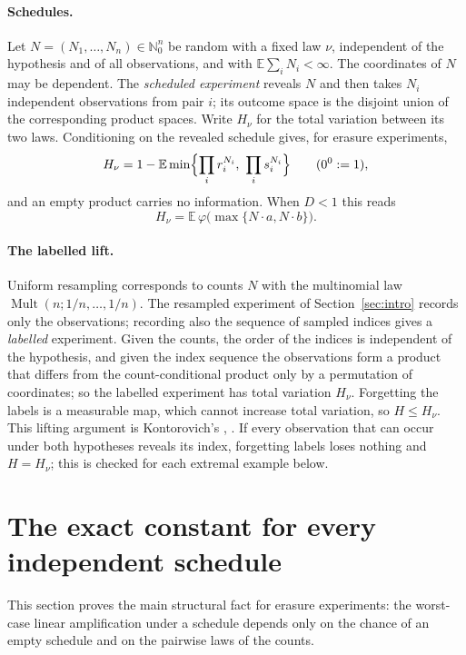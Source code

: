 \documentclass[11pt,a4paper]{article}
\theoremstyle{definition}\newtheorem{definition}[theorem]{Definition}
\theoremstyle{remark}\newtheorem{remark}[theorem]{Remark}
\newcommand{\E}{\mathbb E}
\newcommand{\NN}{\mathbb N_0}
\newcommand{\ph}{\varphi}
\DeclareMathOperator{\Mult}{Mult}
\begin{document}
\paragraph{Schedules.} Let $N=(N_1,\ldots,N_n)\in\NN^n$ be random with a fixed law $\nu$, independent of the hypothesis and of all observations, and with $\E\sum_iN_i<\infty$. The coordinates of $N$ may be dependent. The \emph{scheduled experiment} reveals $N$ and then takes $N_i$ independent observations from pair $i$; its outcome space is the disjoint union of the corresponding product spaces. Write $H_\nu$ for the total variation between its two laws. Conditioning on the revealed schedule gives, for erasure experiments,
\begin{equation}\label{eq:schedule}
H_\nu=1-\E\min\Bigl\{\prod_i r_i^{N_i},\ \prod_i s_i^{N_i}\Bigr\}\qquad(0^0:=1),
\end{equation}
and an empty product carries no information. When $D<1$ this reads
\[
H_\nu=\E\,\ph\bigl(\max\{N\cdot a,N\cdot b\}\bigr).
\]

\paragraph{The labelled lift.} Uniform resampling corresponds to counts $N$ with the multinomial law $\Mult(n;1/n,\ldots,1/n)$. The resampled experiment of Section~\ref{sec:intro} records only the observations; recording also the sequence of sampled indices gives a \emph{labelled} experiment. Given the counts, the order of the indices is independent of the hypothesis, and given the index sequence the observations form a product that differs from the count-conditional product only by a permutation of coordinates; so the labelled experiment has total variation $H_\nu$. Forgetting the labels is a measurable map, which cannot increase total variation, so $H\le H_\nu$. This lifting argument is Kontorovich's \cite[Theorem~3 and proof of Theorem~4]{KApr}, \cite[Proposition~5.3]{KOct}. If every observation that can occur under both hypotheses reveals its index, forgetting labels loses nothing and $H=H_\nu$; this is checked for each extremal example below.

\section{The exact constant for every independent schedule}\label{sec:schedule}
This section proves the main structural fact for erasure experiments: the worst-case linear amplification under a schedule depends only on the chance of an empty schedule and on the pairwise laws of the counts.
\end{document}

